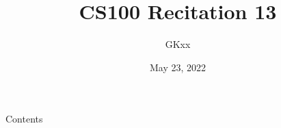 \documentclass{beamer}
\title{CS100 Recitation 13}
\author{GKxx}
\date{May 23, 2022}
\begin{document}
\begin{frame}
    \maketitle
\end{frame}

\begin{frame}{Contents}
    \tableofcontents
\end{frame}




\end{document}
